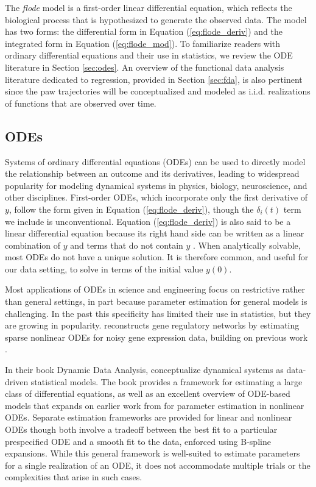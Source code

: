 \documentclass[preprint]{JASA}
\begin{document}
The \emph{flode} model is a first-order linear differential equation,
which reflects the biological process that is hypothesized to generate
the observed data. The model has two forms: the differential form in
Equation (\ref{eq:flode_deriv}) and the integrated form in Equation
(\ref{eq:flode_mod}). To familiarize readers with ordinary differential
equations and their use in statistics, we review the ODE literature in
Section \ref{sec:odes}. An overview of the functional data analysis
literature dedicated to regression, provided in Section \ref{sec:fda},
is also pertinent since the paw trajectories will be conceptualized and
modeled as i.i.d. realizations of functions that are observed over time.

\hypertarget{odes}{%
\subsection{ODEs}\label{odes}}

\label{sec:odes}

Systems of ordinary differential equations (ODEs) can be used to
directly model the relationship between an outcome and its derivatives,
leading to widespread popularity for modeling dynamical systems in
physics, biology, neuroscience, and other disciplines. First-order ODEs,
which incorporate only the first derivative of \(y\), follow the form
given in Equation (\ref{eq:flode_deriv}), though the \(\delta_i(t)\)
term we include is unconventional. Equation (\ref{eq:flode_deriv}) is
also said to be a linear differential equation because its right hand
side can be written as a linear combination of \(y\) and terms that do
not contain \(y\) \citep{tennenbaum1985}. When analytically solvable,
most ODEs do not have a unique solution. It is therefore common, and
useful for our data setting, to solve in terms of the initial value
\(y(0)\).

Most applications of ODEs in science and engineering focus on
restrictive rather than general settings, in part because parameter
estimation for general models is challenging. In the past this
specificity has limited their use in statistics, but they are growing in
popularity. \cite{chen2017} reconstructs gene regulatory networks by
estimating sparse nonlinear ODEs for noisy gene expression data,
building on previous work \citep{lu2011, henderson2014}.

In their book Dynamic Data Analysis, \cite{ramsay2017} conceptualize
dynamical systems as data-driven statistical models. The book provides a
framework for estimating a large class of differential equations, as
well as an excellent overview of ODE-based models that expands on
earlier work from \cite{ramsay2007} for parameter estimation in
nonlinear ODEs. Separate estimation frameworks are provided for linear
and nonlinear ODEs though both involve a tradeoff between the best fit
to a particular prespecified ODE and a smooth fit to the data, enforced
using B-spline expansions. While this general framework is well-suited
to estimate parameters for a single realization of an ODE, it does not
accommodate multiple trials or the complexities that arise in such
cases.
\end{document}
